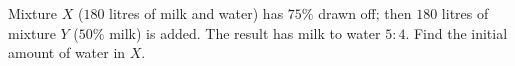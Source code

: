 Mixture $X$ ($180$ litres of milk and water) has $75\%$ drawn off; then $180$ litres of mixture $Y$ ($50\%$ milk) is added. The result has milk to water $5:4$. Find the initial amount of water in $X$.
